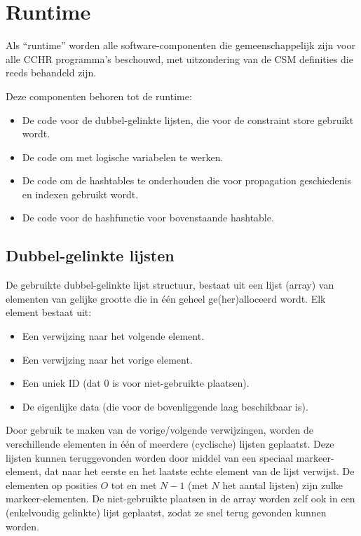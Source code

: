 \section{Runtime} \label{sec:runtime}

Als ``runtime'' worden alle software-componenten die gemeenschappelijk zijn voor alle CCHR programma's beschouwd, met uitzondering van de CSM definities die reeds behandeld zijn.

Deze componenten behoren tot de runtime: \begin{itemize}
  \item De code voor de dubbel-gelinkte lijsten, die voor de constraint store gebruikt wordt.
  \item De code om met logische variabelen te werken.
  \item De code om de hashtables te onderhouden die voor propagation geschiedenis en indexen gebruikt wordt.
  \item De code voor de hashfunctie voor bovenstaande hashtable.
\end{itemize}

\subsection{Dubbel-gelinkte lijsten} \label{sec:dll}

De gebruikte dubbel-gelinkte lijst structuur, bestaat uit een lijst (array) van elementen van gelijke grootte die in \'e\'en geheel ge(her)alloceerd wordt. Elk element bestaat uit: \begin{itemize}
  \item Een verwijzing naar het volgende element.
  \item Een verwijzing naar het vorige element.
  \item Een uniek ID (dat $0$ is voor niet-gebruikte plaatsen).
  \item De eigenlijke data (die voor de bovenliggende laag beschikbaar is).
\end{itemize}
Door gebruik te maken van de vorige/volgende verwijzingen, worden de verschillende elementen in \'e\'en of meerdere (cyclische) lijsten geplaatst. Deze lijsten kunnen teruggevonden worden door middel van een speciaal markeer-element, dat naar het eerste en het laatste echte element van de lijst verwijst. De elementen op posities $O$ tot en met $N-1$ (met $N$ het aantal lijsten) zijn zulke markeer-elementen. De niet-gebruikte plaatsen in de array worden zelf ook in een (enkelvoudig gelinkte) lijst geplaatst, zodat ze snel terug gevonden kunnen worden.

